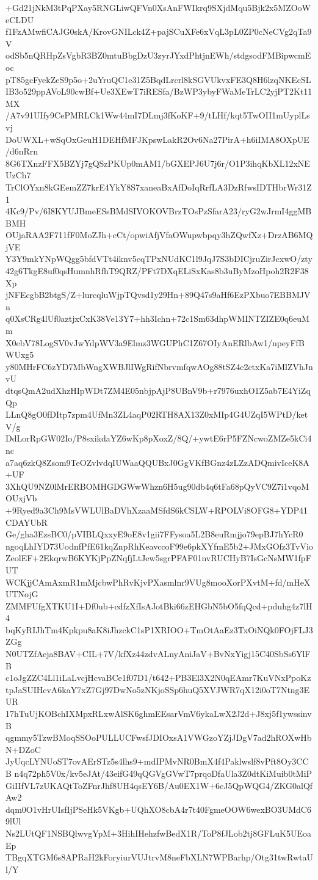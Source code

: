 +Gd21jNkM3tPqPXay5RNGLiwQFVn0XsAnFWIkrq9SXjdMqu5Bjk2x5MZOoWeCLDU
f1FzAMwfiCAJG0skA/KrovGNILck4Z+pajSCuXFe6xVqL3pL0ZP0cNeCVg2qTa9V
odSb5nQRHpZsVgbR3BZ0mtuBbgDzU3zyrJYxdPhtjnEWh/stdgsodFMBipwcmEoc
pT85gcFyekZeS9p5o+2uYruQC1e31Z5BqdLrcrl8kSGVUkvxFE3Q8H6lzqNKEcSL
IB3o529ppAVoL90cwBf+Ue3XEwT7iRESfa/BzWP3ybyFWaMeTrLC2yjPT2Kt11MX
/A7v91UIfy9CePMRLCk1Ww44mI7DLmj3fKoKF+9/tLHf/kqt5TwOII1mUyplLsvj
DoUWXL+wSqOxGeuH1DEHfMFJKpswLakR2Ov6Na27PirA+h6iIMA8OXpUE/d6nRrn
8G6TXnzFFX5BZYj7gQSzPKUp0mAM1/bGXEPJ6U7j6r/O1P3ihqKbXL12xNEUzCh7
TrClOYxn8kGEemZZ7krE4YkY8S7xaneaBxAfDoIqRrfLA3DzRfwsIDTHbrWr31Z1
4Kc9/Pv/6I8KYUJBmeESsBMdSIVOKOVBrzTOsPzSfarA23/ryG2wJrmI4ggMBBMH
OUjaRAA2F711fF0MoZJh+cCt/opwiAfjVfaOWupwbpqy3hZQwfXz+DrzAB6MQjVE
Y3Y9mkYNpWQgg5bfdVTt4iknv5cqTPxNUdKC1l9JqJ7S3bDICjruZirJcxwO/zty
42g6TkgE8uf0qsHumnhRfhT9QRZ/PFt7DXqELiSxKas8b3uByMzoHpoh2R2F38Xp
jNFEcgbB2btgS/Z+lurcqluWjpTQvsd1y29Hn+89Q47s9aHf6EzPXbuo7EBBMJVn
q0XsCRg4lUf0aztjxCxK38Ve13Y7+hh3Ichn+72c1Sm63dhpWMINTZIZE0q6euMm
X0ebV78LogSV0vJwYdpWV3a9Elmz3WGUPhC1Z67OIyAnERlbAw1/npeyFfBWUxg5
y80MHrFC6zYD7MbWngXWBJlIWgRifNbrvmfqwAOg88tSZ4c2ctxKa7iMlZVhJnvU
dtqsQmA2udXhzHIpWDt7ZM4E05nbjpAjP8UBnV9b+r7976uxhO1Z5ab7E4YiZqQp
LLnQ8gO0fDItp7zpm4UfMn3ZL4aqP02RTH8AX13Z0xMIp4G4UZqI5WPtD/ketV/g
DdLorRpGW02Io/P8sxikdaYZ6wKp8pXoxZ/8Q/+ywtE6rP5FZNcwoZMZe5kCi4nc
a7aq6zkQ8Zsom9TeOZvlvdqIUWaaQQUBxJ0GgVKfBGnz4zLZzADQmivIceK8A+UF
3XhQU9NZ0lMrERBOMHGDGWwWhzn6H5ug90db4q6tFa68pQyVC9Z7i1vqoMOUxjVb
+9Ryed9a3Ch9MsVWLUlBaDVhXzaaMSfdS6kCSLW+RPOLVi8OFG8+YDP41CDAYUbR
Ge/gha3EzsBC0/pVIBLQxxyE9oE8v1gii7FFysoa5L2B8euRmjjo79epBJ7hYcR0
ngoqLhIYD73UodnfPfE61kqZnpRhKeavccoF99e6pkXYfmE5b2+JMxGOfz3TvVio
ZeolEF+2EkqrwB6KYKjPpZNqfjLtJew5sgrPFAF01nvRUCHyB7IsGcNsMW1fpFUT
WCKjjCAmAxmR1mMjcbwPhRvKjvPXasmlnr9VUg8mooXorPXvtM+fd/mHeXUTNojG
ZMMFUfgXTKU1I+Df0ub+cdfzXfIsAJotBki66zEHGbN5bO5fqQcd+pduhg4z7lH4
bqKyRIJhTm4Kpkpu8aK8iJhzckC1sP1XRIOO+TmOtAaEz3TxOiNQk0FOjFLJ3ZGg
N0UTZfAeja8BAV+CIL+7V/kfXz44zdvALnyAniJaV+BvNxYigj15C40SbSs6YlFB
c1oJgZZC4Ll1iLaLvcjHcvaBCe1f07D1/t642+PB3El3X2N0qEAmr7KuVNxPpoKz
tpJaSUIHcvA6kaY7xZ7Gj97DwNo5zNKjoSSp6huQ5XVJWR7qX12i0oT7Ntng3EUR
17hTuUjKOBchIXMpxRLxwAlSK6ghmEEsarVmV6ykaLwX2J2d+J8xj5f1ywssinvB
qgmmy5TzwBMoqSSOoPULLUCFwsfJDIOxsA1VWGzoYZjJDgV7ad2hROXwHbN+DZoC
JyUqcLYNUoST7ovAErSTz5s4lhs9+mdIPMvNR0BmX4f4Paklwslf8vPft8Oy3CCB
n4q72ph5V0x/kv5eJAt/43eifG49qQGVgGVwT7prqoDfaUla3Z0dtKiMuib0tMiP
GiIIfVL7zUKAQtToZFnrJhf8UH4qsEY6B/Au0EX1W+6cJ5QpWQG4/ZKG0alQfAw2
dqm0O1vHrUIsfIjPSeHk5VKgb+UQhXO8cbA4r7t40FgmeOOW6wexBO3UMdC69lUl
Ns2LUtQF1NSBQlwvgYpM+3HihIHehzfwBedX1R/ToP8fJLob2tj8GFLuK5UEoaEp
TBgqXTGM6s8APRaH2kForyiurVUJtrvM8neFbXLN7WPBarhp/Otg31twRwtaUl/Y
